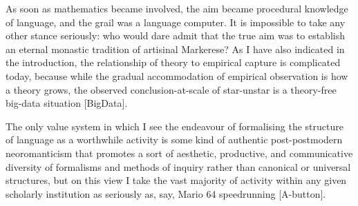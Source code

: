 As soon as mathematics became involved, the aim became procedural knowledge of language, and the grail was a language computer. It is impossible to take any other stance seriously: who would dare admit that the true aim was to establish an eternal monastic tradition of artisinal Markerese? As I have also indicated in the introduction, the relationship of theory to empirical capture is complicated today, because while the gradual accommodation of empirical observation is how a theory grows, the observed conclusion-at-scale of star-unstar is a theory-free big-data situation [BigData]. 



The only value system in which I see the endeavour of formalising the structure of language as a worthwhile activity is some kind of authentic post-postmodern neoromanticism that promotes a sort of aesthetic, productive, and communicative diversity of formalisms and methods of inquiry rather than canonical or universal structures, but on this view I take the vast majority of activity within any given scholarly institution as seriously as, say, Mario 64 speedrunning [A-button]. 